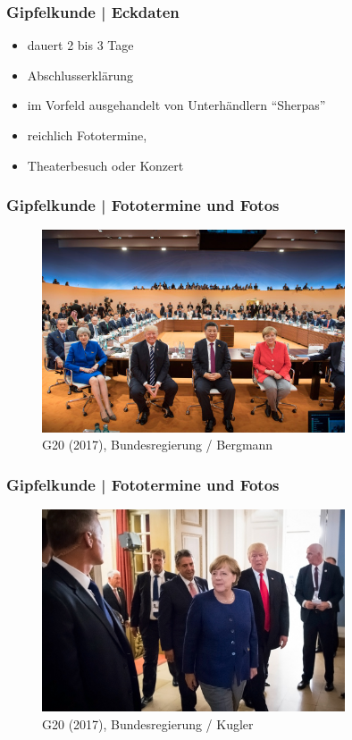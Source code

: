 \documentclass[]{beamer}
\begin{document}
	\begin{frame}
		\frametitle{Gipfelkunde | Eckdaten}
		\begin{itemize}
			\item dauert 2 bis 3 Tage
			\item Abschlusserklärung
			\item im Vorfeld ausgehandelt von Unterhändlern \enquote{Sherpas}
			\item reichlich Fototermine, 
			\item Theaterbesuch oder Konzert
		\end{itemize}
	\end{frame}

	\begin{frame}
	\frametitle{Gipfelkunde | Fototermine und Fotos}
	\begin{figure}[h!]
		\renewcommand{\figurename}{Foto} 
		\includegraphics[width=0.8\textwidth]{images/fotos_01_BundesregierungBergmann}
		\caption{G20 (2017), Bundesregierung / Bergmann}
	\end{figure}
	\end{frame}

	\begin{frame}
	\frametitle{Gipfelkunde | Fototermine und Fotos}
	\begin{figure}[h!]
		\renewcommand{\figurename}{Foto} 
		\includegraphics[width=0.8\textwidth]{images/fotos_02_BundesregierungKugler}
		\caption{G20 (2017), Bundesregierung / Kugler}
	\end{figure}
	\end{frame}
\end{document}
